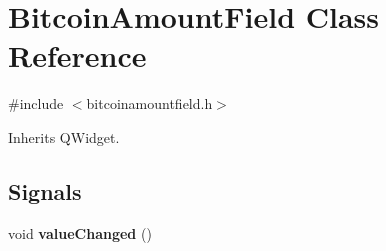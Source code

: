 \hypertarget{class_bitcoin_amount_field}{}\section{Bitcoin\+Amount\+Field Class Reference}
\label{class_bitcoin_amount_field}


{\ttfamily \#include $<$bitcoinamountfield.\+h$>$}



Inherits Q\+Widget.

\subsection*{Signals}
\begin{DoxyCompactItemize}
\item 
\mbox{\label{class_bitcoin_amount_field_a633110e7cd2ed74091932459236a7949}} 
void {\bfseries value\+Changed} ()
\end{DoxyCompactItemize}
